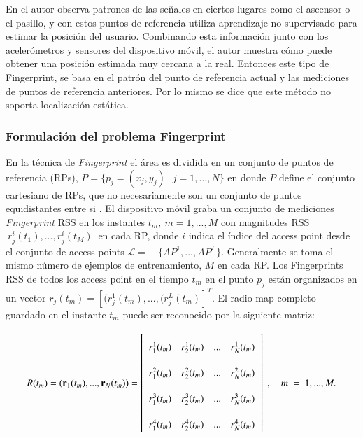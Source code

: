\begin{enumerate}
En \cite{Wang:2012:NNW:2307636.2307655} el autor observa patrones de las señales en ciertos lugares como el ascensor o el pasillo, y con estos puntos de referencia utiliza aprendizaje no supervisado para estimar la posición del usuario. Combinando esta información junto con los acelerómetros y sensores del dispositivo móvil, el autor muestra cómo puede obtener una posición estimada muy cercana a la real. Entonces este tipo de Fingerprint, se basa en el patrón del punto de referencia actual y las mediciones de puntos de referencia anteriores. Por lo mismo se dice que este método no soporta localización estática.

\end{enumerate}

\subsubsection{Formulación del problema Fingerprint}

En la técnica de \textit{Fingerprint} el área es dividida en un conjunto de puntos de referencia (RPs), \(P = \{p_{j} = (x_{j}, y_{j}) \ | \ j = 1,...,N\}\) en donde \(P\) define el conjunto cartesiano de RPs, que no necesariamente son un conjunto de puntos equidistantes entre si \citep{7874080}. El dispositivo móvil graba un conjunto de mediciones \textit{Fingerprint} RSS en los instantes \(t_{m} ,\ m = 1,...,M\) con magnitudes RSS \( \ r_{j}^{i}(t_{1}),..., r_{j}^{i}(t_{M}) \ \) en cada RP, donde \(i\) indica el índice del access point desde el conjunto de access points \( \mathcal{L} = \quad \{AP^{1}, ..., AP^{L}\}\). Generalmente se toma el mismo número de ejemplos de entrenamiento, \(M\) en cada RP. Los Fingerprints RSS de todos los access point en el tiempo \(t_{m}\) en el punto \(p_{j}\) están organizados en un vector \(r_{j}(t_{m}) = [(r_{j}^{1}(t_{m}),...,(r_{j}^{L}(t_{m})]^{T}\). El radio map completo guardado en el instante \(t_m\) puede ser reconocido por la siguiente matriz:


\begin{align}
\def\arraystretch{2.2}
   R(t_{m}) = (\textbf{r}_{1}(t_{m}), ..., \textbf{r}_{N}(t_{m})) = 
  \left[ {\begin{array}{cccc}
   r_{1}^{1}(t_{m}) & r_{2}^{1}(t_{m}) & ... & r_{N}^{1}(t_{m}) \\
   r_{1}^{2}(t_{m}) & r_{2}^{2}(t_{m}) & ... & r_{N}^{2}(t_{m}) \\
   r_{1}^{3}(t_{m}) & r_{2}^{3}(t_{m}) & ... & r_{N}^{3}(t_{m}) \\
   r_{1}^{4}(t_{m}) & r_{2}^{4}(t_{m}) & ... & r_{N}^{4}(t_{m}) \\
  \end{array} } \right] \ , \quad 
m\ = \ 1,...,M.
\end{align}
 

